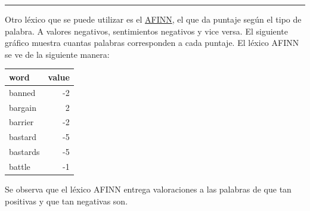 \documentclass[
]{article}
\begin{document}
\begin{center}\rule{0.5\linewidth}{0.5pt}\end{center}

Otro léxico que se puede utilizar es el
\href{http://www2.imm.dtu.dk/pubdb/pubs/6010-full.html}{AFINN}, el que
da puntaje según el tipo de palabra. A valores negativos, sentimientos
negativos y vice versa. El siguiente gráfico muestra cuantas palabras
corresponden a cada puntaje. El léxico AFINN se ve de la siguiente
manera:

\begin{table}[H]
\centering
\begin{tabular}[t]{l|r}
\hline
word & value\\
\hline
banned & -2\\
\hline
bargain & 2\\
\hline
barrier & -2\\
\hline
bastard & -5\\
\hline
bastards & -5\\
\hline
battle & -1\\
\hline
\end{tabular}
\end{table}

Se observa que el léxico AFINN entrega valoraciones a las palabras de
que tan positivas y que tan negativas son.
\end{document}
